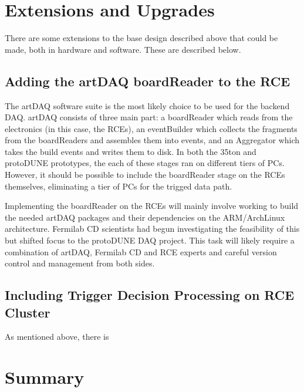 




\section{Extensions and Upgrades}
\label{sec:upgrades}

There are some extensions to the base design described above that could be made, both in hardware and software.  These are described below. 

\subsection{Adding the artDAQ boardReader to the RCE}
\label{sec:board reader}
The artDAQ software suite is the most likely choice to be used for the backend DAQ.  artDAQ consists of three main part:  a boardReader which reads from the electronics (in this case, the RCEs), an eventBuilder which collects the fragments from the boardReaders and assembles them into events, and an Aggregator which takes the build events and writes them to disk.  In both the 35ton and protoDUNE prototypes, the each of these stages ran on different tiers of PCs.  However, it should be possible to include the boardReader stage on the RCEs themselves, eliminating a tier of PCs for the trigged data path. 

Implementing the boardReader on the RCEs will mainly involve working to build the needed artDAQ packages and their dependencies on the ARM/ArchLinux architecture.  Fermilab CD scientists had begun investigating the feasibility of this but shifted focus to the protoDUNE DAQ project.  This task will likely require a combination of artDAQ, Fermilab CD and  RCE experts and careful version control and management from both sides.  

\subsection{Including Trigger Decision Processing on RCE Cluster}
\label{sec:triggerOnRCE}
As mentioned above, there is 



\section{Summary}






